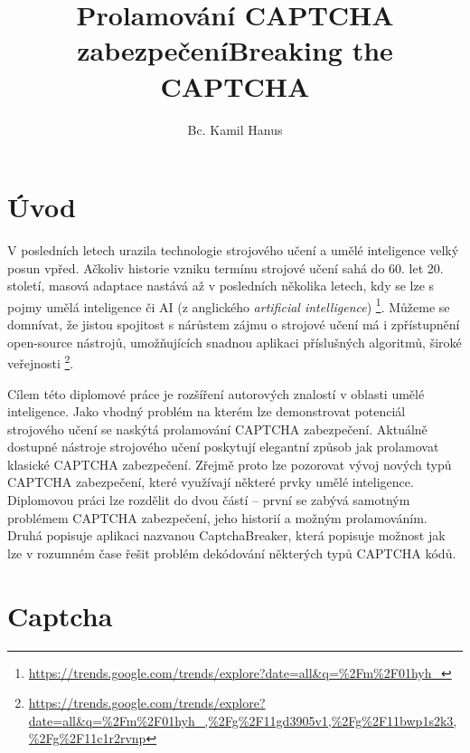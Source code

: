\documentclass[
  field=ainfp,
  master=true,
  biblatex,
  sourcecodes=false,
  theorems=false,
  glossaries,
  index
]{kidiplom}
\title{Prolamování CAPTCHA zabezpečení}
\title[english]{Breaking the CAPTCHA}
\author{Bc. Kamil Hanus}
\begin{document}
\maketitle



\newcommand{\BibLaTeX}{\textsc{Bib}\LaTeX}
\renewcommand\UrlFont{}



\section{Úvod}
V posledních letech urazila technologie strojového učení a umělé inteligence velký posun vpřed. Ačkoliv historie vzniku termínu strojové učení sahá do  60. let 20. století, masová adaptace nastává až v posledních několika letech, kdy se lze s pojmy umělá inteligence či AI (z anglického \textit{artificial intelligence}) \footnote{\url{https://trends.google.com/trends/explore?date=all\&q=\%2Fm\%2F01hyh\_}}. Můžeme se domnívat, že jistou spojitost s nárůstem zájmu o strojové učení má i zpřístupnění open-source nástrojů, umožňujících snadnou aplikaci příslušných algoritmů, široké veřejnosti \footnote{\url{https://trends.google.com/trends/explore?date=all\&q=\%2Fm\%2F01hyh\_,\%2Fg\%2F11gd3905v1,\%2Fg\%2F11bwp1s2k3,\%2Fg\%2F11c1r2rvnp}}.

Cílem této diplomové práce je  rozšíření autorových znalostí v oblasti umělé inteligence. Jako vhodný problém na kterém lze demonstrovat potenciál strojového učení se naskýtá prolamování CAPTCHA zabezpečení. Aktuálně dostupné nástroje strojového učení poskytují elegantní způsob jak prolamovat klasické CAPTCHA zabezpečení. Zřejmě proto lze pozorovat vývoj nových typů CAPTCHA zabezpečení, které využívají některé prvky umělé inteligence. Diplomovou práci lze rozdělit do dvou částí -- první se zabývá samotným problémem CAPTCHA zabezpečení, jeho historií a možným prolamováním. Druhá popisuje aplikaci nazvanou CaptchaBreaker, která popisuje možnost jak lze v rozumném čase řešit problém dekódování některých typů CAPTCHA kódů.
\newpage
\section{Captcha}
\end{document}
